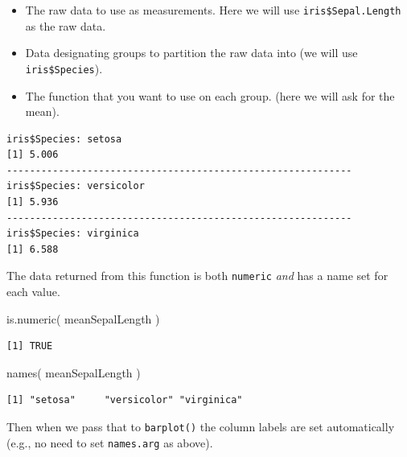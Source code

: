 \documentclass[
  letterpaper,
]{book}
\newenvironment{Shaded}{\begin{snugshade}}{\end{snugshade}}
\newcommand{\FunctionTok}[1]{\textcolor[rgb]{0.28,0.35,0.67}{#1}}
\newcommand{\NormalTok}[1]{\textcolor[rgb]{0.00,0.23,0.31}{#1}}
\newcommand{\OtherTok}[1]{\textcolor[rgb]{0.00,0.23,0.31}{#1}}
\newcommand{\SpecialCharTok}[1]{\textcolor[rgb]{0.37,0.37,0.37}{#1}}
\providecommand{\tightlist}{%
  \setlength{\itemsep}{0pt}\setlength{\parskip}{0pt}}
\begin{document}
\begin{itemize}
\tightlist
\item
  The raw data to use as measurements. Here we will use
  \texttt{iris\$Sepal.Length} as the raw data.
\item
  Data designating groups to partition the raw data into (we will use
  \texttt{iris\$Species}).
\item
  The function that you want to use on each group. (here we will ask for
  the mean).
\end{itemize}

\begin{Shaded}
\end{Shaded}

\begin{verbatim}
iris$Species: setosa
[1] 5.006
------------------------------------------------------------ 
iris$Species: versicolor
[1] 5.936
------------------------------------------------------------ 
iris$Species: virginica
[1] 6.588
\end{verbatim}

The data returned from this function is both \texttt{numeric} \emph{and}
has a name set for each value.

\begin{Shaded}
\begin{Highlighting}[]
\FunctionTok{is.numeric}\NormalTok{( meanSepalLength )}
\end{Highlighting}
\end{Shaded}

\begin{verbatim}
[1] TRUE
\end{verbatim}

\begin{Shaded}
\begin{Highlighting}[]
\FunctionTok{names}\NormalTok{( meanSepalLength )}
\end{Highlighting}
\end{Shaded}

\begin{verbatim}
[1] "setosa"     "versicolor" "virginica" 
\end{verbatim}

Then when we pass that to \texttt{barplot()} the column labels are set
automatically (e.g., no need to set \texttt{names.arg} as above).
\end{document}
